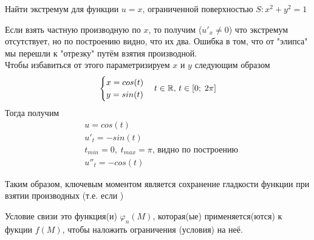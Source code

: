 \begin{Example}
    Найти экстремум для функции $u = x$, ограниченной поверхностью $S: x^2 + y^2 = 1$\\
    \begin{figure}[h!]
    \noindent{}
    \end{figure}

    Если взять частную производную по $x$, то получим ($u'_x \neq 0$) что экстремум отсутствует, но по построению видно, что их два. Ошибка в том, что от "элипса" мы перешли к "отрезку" путём взятия производной.\\
    
    Чтобы избавиться от этого параметризируем $x$ и $y$ следующим образом
    \[
        \begin{cases}
        x = cos(t)\\
        y = sin(t) 
        \end{cases}
        t \in \mathbb{R}, \, t \in [0;\; 2\pi]
    \] 
    Тогда получим
    \begin{align*}
        &u = cos(t)\\
        &u'_t = -sin(t)\\
        &t_{min} = 0, \; t_{max} = \pi \text{, видно по построению}\\ 
        &u''_t = -cos(t)
    \end{align*}
    
\end{Example}
Таким образом, ключевым моментом является сохранение гладкости функции при взятии производных (т.е. если )

\begin{Note}
    Условие свизи это функция(и) $\varphi_n(M)$, которая(ые) применяется(ются) к фукции $f(M)$, чтобы наложить ограничения (условия) на неё.
\end{Note}

